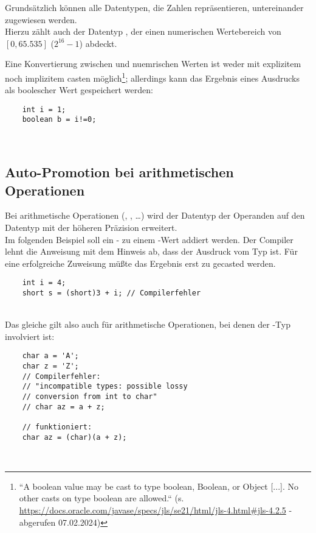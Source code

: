 \noindent
Grundsätzlich können alle Datentypen, die Zahlen repräsentieren, untereinander zugewiesen werden.\\
Hierzu zählt auch der Datentyp , der einen numerischen Wertebereich von $[0, 65.535]$ ($2^{16}-1$) abdeckt.

\noindent
Eine Konvertierung zwischen  und nuemrischen Werten ist weder mit explizitem noch implizitem casten möglich\footnote{
``A boolean value may be cast to type boolean, Boolean, or Object [...]. No other casts on type boolean are allowed.`` (s. \url{https://docs.oracle.com/javase/specs/jls/se21/html/jls-4.html#jls-4.2.5} - abgerufen 07.02.2024)
}; allerdings kann das Ergebnis eines Ausdrucks als boolescher Wert gespeichert werden:
\begin{verbatim}
    int i = 1;
    boolean b = i!=0;
\end{verbatim}\\

\subsection{Auto-Promotion bei arithmetischen Operationen}

Bei arithmetische Operationen (\code{+}, \code{-}, \ldots) wird der Datentyp der Operanden auf den Datentyp mit der höheren Präzision erweitert.\\

\noindent
Im folgenden Beispiel soll ein - zu einem -Wert addiert werden.
Der Compiler lehnt die Anweisung mit dem Hinweis ab, dass der Ausdruck  vom Typ  ist.
Für eine erfolgreiche Zuweisung müßte das Ergebnis erst zu  gecasted werden.

\begin{verbatim}
    int i = 4;
    short s = (short)3 + i; // Compilerfehler
\end{verbatim}\\

Das gleiche gilt also auch für arithmetische Operationen, bei denen der -Typ involviert ist:


\begin{verbatim}
    char a = 'A';
    char z = 'Z';
    // Compilerfehler:
    // "incompatible types: possible lossy
    // conversion from int to char"
    // char az = a + z;

    // funktioniert:
    char az = (char)(a + z);
\end{verbatim}\\


